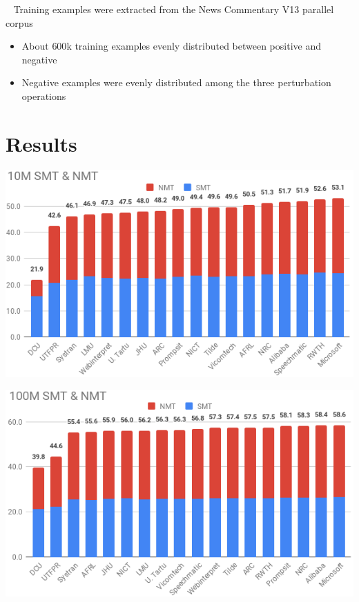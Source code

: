\documentclass[a0]{sciposter}
\begin{document}
\begin{multicols*}{2}
~\newline
Training examples were extracted from the News Commentary V13 parallel corpus
\begin{itemize}
  \item About $600$k training examples evenly distributed between positive and negative
  \item Negative examples were evenly distributed among the three perturbation operations
\end{itemize}





\section*{\Large Results}

\begin{center}
\includegraphics[width=0.85\columnwidth]{assets/10M_crop.png}

\includegraphics[width=0.85\columnwidth]{assets/100M_crop.png}
\end{center}


\end{multicols*}
\end{document}
